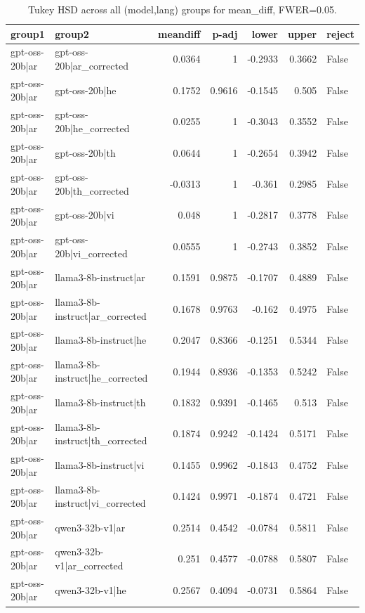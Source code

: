 \begin{table}
\caption{Tukey HSD across all (model,lang) groups for mean_diff, FWER=0.05.}
\label{tab:tukey_all_models_all_langs_mean_diff}
\begin{tabular}{l l r r r r l}
\toprule
group1 & group2 & meandiff & p-adj & lower & upper & reject \\
\midrule
gpt-oss-20b|ar & gpt-oss-20b|ar_corrected & 0.0364 & 1 & -0.2933 & 0.3662 & False \\
gpt-oss-20b|ar & gpt-oss-20b|he & 0.1752 & 0.9616 & -0.1545 & 0.505 & False \\
gpt-oss-20b|ar & gpt-oss-20b|he_corrected & 0.0255 & 1 & -0.3043 & 0.3552 & False \\
gpt-oss-20b|ar & gpt-oss-20b|th & 0.0644 & 1 & -0.2654 & 0.3942 & False \\
gpt-oss-20b|ar & gpt-oss-20b|th_corrected & -0.0313 & 1 & -0.361 & 0.2985 & False \\
gpt-oss-20b|ar & gpt-oss-20b|vi & 0.048 & 1 & -0.2817 & 0.3778 & False \\
gpt-oss-20b|ar & gpt-oss-20b|vi_corrected & 0.0555 & 1 & -0.2743 & 0.3852 & False \\
gpt-oss-20b|ar & llama3-8b-instruct|ar & 0.1591 & 0.9875 & -0.1707 & 0.4889 & False \\
gpt-oss-20b|ar & llama3-8b-instruct|ar_corrected & 0.1678 & 0.9763 & -0.162 & 0.4975 & False \\
gpt-oss-20b|ar & llama3-8b-instruct|he & 0.2047 & 0.8366 & -0.1251 & 0.5344 & False \\
gpt-oss-20b|ar & llama3-8b-instruct|he_corrected & 0.1944 & 0.8936 & -0.1353 & 0.5242 & False \\
gpt-oss-20b|ar & llama3-8b-instruct|th & 0.1832 & 0.9391 & -0.1465 & 0.513 & False \\
gpt-oss-20b|ar & llama3-8b-instruct|th_corrected & 0.1874 & 0.9242 & -0.1424 & 0.5171 & False \\
gpt-oss-20b|ar & llama3-8b-instruct|vi & 0.1455 & 0.9962 & -0.1843 & 0.4752 & False \\
gpt-oss-20b|ar & llama3-8b-instruct|vi_corrected & 0.1424 & 0.9971 & -0.1874 & 0.4721 & False \\
gpt-oss-20b|ar & qwen3-32b-v1|ar & 0.2514 & 0.4542 & -0.0784 & 0.5811 & False \\
gpt-oss-20b|ar & qwen3-32b-v1|ar_corrected & 0.251 & 0.4577 & -0.0788 & 0.5807 & False \\
gpt-oss-20b|ar & qwen3-32b-v1|he & 0.2567 & 0.4094 & -0.0731 & 0.5864 & False \\

\end{tabular}
\end{table}
